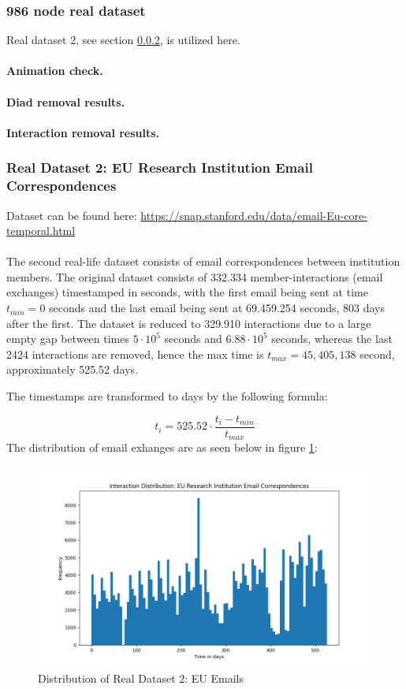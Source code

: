 \subsubsection{986 node real dataset}
\label{sec:ResearchQuestion2:986nodeReal}

Real dataset 2, see section \ref{sec:Data:RealData:RealDataset2}, is utilized here.
\\\\
\textbf{Animation check.}
\\\\
\textbf{Diad removal results.}
\\\\
\textbf{Interaction removal results.}



\subsubsection{Real Dataset 2: EU Research Institution Email Correspondences}
\label{sec:Data:RealData:RealDataset2}
Dataset can be found here: \href{https://snap.stanford.edu/data/email-Eu-core-temporal.html}{https://snap.stanford.edu/data/email-Eu-core-temporal.html}
\\\\
The second real-life dataset consists of email correspondences between institution members.
The original dataset consists of 332.334 member-interactions (email exchanges) timestamped in seconds, with the first email being sent at time $t_{min} = 0$ seconds and the last email being sent at 69.459.254 seconds, 803 days after the first.
The dataset is reduced to 329.910 interactions due to a large empty gap between times $5 \cdot 10^5$ seconds and $6.88 \cdot 10^5$ seconds, whereas the last 2424 interactions are removed, hence the max time is $t_{max} = 45,405,138$ second, approximately 525.52 days.

The timestamps are transformed to days by the following formula:

\begin{equation}
    t_i = 525.52 \cdot \frac{t_i - t_{min}}{t_{max}}
\end{equation}
The distribution of email exhanges are as seen below in figure \ref{fig:RLdataset2}:

\begin{figure}[H]
    \centering
    \includegraphics[width=\textwidth]{0_images/reallife_dataset_2_dist.png}
    \caption{Distribution of Real Dataset 2: EU Emails}
    \label{fig:RLdataset2}
\end{figure}